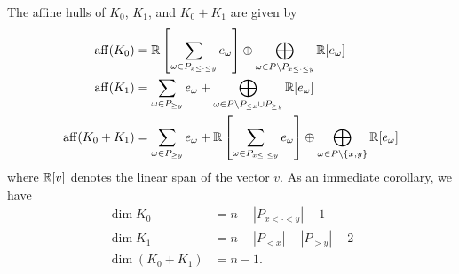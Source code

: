 \documentclass{puthesis-UG}
\begin{document}
\begin{lem} \label{affine-hulls}
    The affine hulls of $K_0$, $K_1$, and $K_0 + K_1$ are given by 
    \begin{align*}
        \operatorname{aff} (K_0) & = \mathbb{R} \left [ \sum_{\omega \in P_{x \leq \cdot \leq y}} e_\omega \right ] \oplus \bigoplus_{\omega \in P \backslash P_{x \leq \cdot \leq y}} \mathbb{R}[e_\omega] \\
        \operatorname{aff} (K_1) & = \sum_{\omega \in P_{\geq y}} e_\omega + \bigoplus_{\omega \in P \backslash {P_{\leq x} \cup P_{\geq y}}} \mathbb{R}[e_\omega] \\
        \operatorname{aff} (K_0 + K_1) & = \sum_{\omega \in P_{\geq y}} e_\omega + \mathbb{R} \left [ \sum_{\omega \in P_{x \leq \cdot \leq y}} e_\omega \right ] \oplus \bigoplus_{\omega \in P \backslash \{x, y\}} \mathbb{R}[e_\omega]
    \end{align*}
    where $\mathbb{R}[v]$ denotes the linear span of the vector $v$. As an immediate corollary, we have
    \begin{align*}
        \dim K_0 & = n - |P_{x < \cdot < y}| - 1 \\
        \dim K_1 & = n - |P_{< x}| - |P_{> y}| - 2 \\
        \dim (K_0 + K_1) & = n-1.
    \end{align*}
\end{lem}
\end{document}
